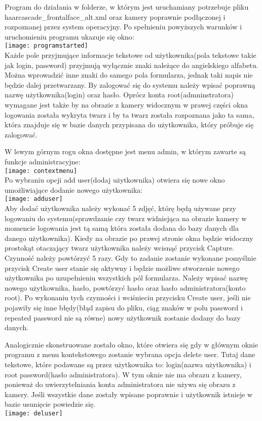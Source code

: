 \documentclass[eng,printmode]{mgr}
\begin{document}
Program do działania w folderze, w którym jest uruchamiany potrzebuje pliku haarcascade\_frontalface\_alt.xml oraz kamery poprawnie podłączonej i rozpoznanej przez system operacyjny. Po spełnieniu powyższych warunków i uruchomieniu programu ukazuje się okno:\\

\texttt{[image: programstarted]}\\

Każde pole przyjmujące informacje tekstowe od użytkownika(pola tekstowe takie jak login, password) przyjmują wyłącznie znaki należące do angielskiego alfabetu. Można wprowadzić inne znaki do samego pola formularza, jednak taki napis nie będzie dalej przetwarzany. By zalogować się do systemu należy wpisać poprawną nazwę użytkownika(login) oraz hasło. Oprócz konta root(admninstratora) wymagane jest także by na obrazie z kamery widocznym w prawej części okna logowania została wykryta twarz i by ta twarz została rozpoznana jako ta sama, która znajduje się w bazie danych przypisana do użytkownika, który próbuje się zalogować.

W lewym górnym rogu okna dostępne jest menu admin, w którym zawarte są funkcje administracyjne:\\
\texttt{[image: contextmenu]}\\

Po wybraniu opcji add user(dodaj użytkownika) otwiera się nowe okno umożliwiające dodanie nowego użytkownika:\\
\texttt{[image: adduser]}\\
Aby dodać użytkownika należy wykonać 5 zdjęć, którę będą używane przy logowaniu do systemu(sprawdzanie czy twarz widniejąca na obrazie kamery w momencie logowania jest tą samą która została dodana do bazy danych dla danego użytkownika). Kiedy na obrazie po prawej stronie okna będzie widoczny prostokąt otaczający twarz użytkownika należy wcisnąć przycisk Capture. Czynność należy powtórzyć 5 razy. Gdy to zadanie zostanie wykonane pomyślnie przycisk Create user stanie się aktywny i będzie możliwe stworzenie nowego użytkownika po uzupełnieniu wszystkich pól formularza. Należy wpisać nazwę nowego użytkownika, hasło, powtórzyć hasło oraz hasło administratora(konto root). Po wykonaniu tych czynności i wciśnieciu przycisku Create user, jeśli nie pojawiły się inne błędy(błąd zapisu do pliku, ciąg znaków w polu password i repeated password nie są równe) nowy użytkownik zostanie dodany do bazy danych.

Analogicznie skonstruowane zostało okno, które otwiera się gdy w głównym oknie programu z menu kontekstowego zostanie wybrana opcja delete user. Tutaj dane tekstowe, które podawane są przez użytkownika to: login(nazwa użytkownika) i root password(hasło administratora). W tym oknie nie ma obrazu z kamery, ponieważ do uwierzytelniania konta administratora nie używa się obrazu z kamery. Jeśli wszystkie dane zostały wpisane poprawnie i użytkownik istnieje w bazie usunięcie powiedzie się.\\
\texttt{[image: deluser]}\\
\end{document}
